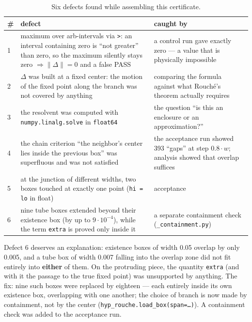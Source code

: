 \begin{table}[h]
\centering
\caption{Six defects found while assembling this certificate.}\label{tab:defects}
\begin{tabular}{p{}p{}p{}}
\toprule
\# & defect & caught by \\
\midrule
1 & maximum over arb-intervals via \texttt{>}: an interval containing zero is ``not greater'' than zero, so the maximum silently stays zero $\Rightarrow \|\Delta\| = 0$ and a false PASS & a control run gave exactly zero --- a value that is physically impossible \\
2 & $\Delta$ was built at a fixed center: the motion of the fixed point along the branch was not covered by anything & comparing the formula against what Rouché's theorem actually requires \\
3 & the resolvent was computed with \texttt{numpy.linalg.solve} in \texttt{float64} & the question ``is this an enclosure or an approximation?'' \\
4 & the chain criterion ``the neighbor's center lies inside the previous box'' was superfluous and was not satisfied & the acceptance run showed 393 ``gaps'' at step $0.8\cdot w$; analysis showed that overlap suffices \\
5 & at the junction of different widths, two boxes touched at exactly one point (\texttt{hi = lo} in float) & acceptance \\
6 & nine tube boxes extended beyond their existence box (by up to $9\cdot 10^{-4}$), while the term \texttt{extra} is proved only inside it & a separate containment check (\texttt{\_\allowbreak containment.py}) \\
\bottomrule
\end{tabular}
\end{table}
\FloatBarrier

Defect 6 deserves an explanation: existence boxes of width 0.05 overlap by
only 0.005, and a tube box of width 0.007 falling into the overlap zone did
not fit entirely into \textbf{either} of them. On the protruding piece, the
quantity \texttt{extra} (and with it the passage to the true fixed point) was
unsupported by anything. The fix: nine such boxes were replaced by
eighteen --- each entirely inside its own existence box, overlapping with
one another; the choice of branch is now made by containment, not by the
center (\texttt{hyp\_\allowbreak rouche.load\_\allowbreak box(span=\ldots)}). A containment check was added to
the acceptance run.

